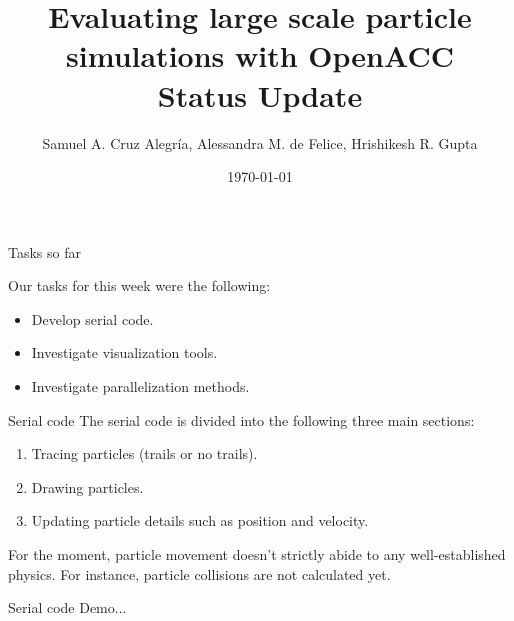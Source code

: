 \documentclass[aspectratio=169]{beamer}
\title[Particle Simulations with OpenACC]{\textbf{Evaluating large scale particle simulations with OpenACC}\\[0.5em] Status Update}
\author{Samuel A. Cruz Alegr\'{i}a, Alessandra M. de Felice, Hrishikesh R. Gupta}
\institute{(University of Lugano)}
\date{\today}
\begin{document}
\begin{frame}
\titlepage
\end{frame}

\begin{frame}[fragile]{Tasks so far}

Our tasks for this week were the following:
%
\begin{itemize}
	\item Develop serial code.
	\item Investigate visualization tools.
	\item Investigate parallelization methods.
\end{itemize}
%

\end{frame}

\begin{frame}[fragile]{Serial code}
	The serial code is divided into the following three main sections:
	\begin{enumerate}
		\item Tracing particles (trails or no trails).
		\item Drawing particles.
		\item Updating particle details such as position and velocity.
	\end{enumerate}
	
	For the moment, particle movement doesn't strictly abide to any well-established physics. For instance, particle collisions are not calculated yet.
\end{frame}

\begin{frame}[fragile]{Serial code}
	Demo...
\end{frame}
\end{document}
